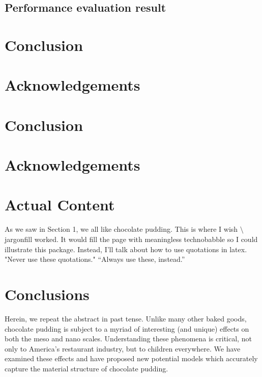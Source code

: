 \documentclass{ccr15}
\begin{document}
\subsection{Performance evaluation result}
\section{Conclusion}
\section{Acknowledgements}

\section{Conclusion}

\section{Acknowledgements}

\section{Actual Content}
As we saw in Section 1, we all like chocolate pudding. This is where I wish
\textsf{$\setminus$jargonfill} worked. It would fill the page with meaningless technobabble so I could illustrate this
package. Instead, I'll talk about how to use quotations in latex. "Never use these quotations." ``Always use these,
instead.''
\section{Conclusions}
Herein, we repeat the abstract in past tense.
Unlike many other baked goods, chocolate pudding is subject to a myriad of interesting (and unique) effects on both the
meso and nano scales. Understanding these phenomena is critical, not only to America's restaurant industry, but to
children everywhere. We have examined these effects and have proposed new potential models which accurately capture
the material structure of chocolate pudding.

\nocite{ZAB:Mentor05}
\nocite{ZAB:TechHPCG}

%
\end{document}
